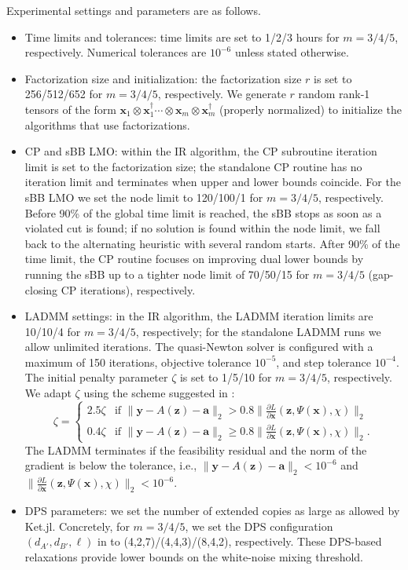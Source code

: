 \documentclass[smallextended]{svjour3}
\newcommand{\1}{\mathbf{1}}
\newcommand{\x}{\mathbf{x}}
\newcommand{\y}{\mathbf{y}}
\newcommand{\z}{\mathbf{z}}
\renewcommand{\a}{\mathbf{a}}
\DeclareMathOperator{\mtens}{\otimes}
\newcommand{\norm}[1]{\lVert#1\rVert}
\begin{document}
Experimental settings and parameters are as follows.

\begin{itemize}
    \item Time limits and tolerances: time limits are set to 1/2/3 hours for $m=3/4/5$, respectively. Numerical tolerances are $10^{-6}$ unless stated otherwise.
    \item Factorization size and initialization: the factorization size $r$ is set to 256/512/652 for $m=3/4/5$, respectively. We generate $r$ random rank-1 tensors of the form $\x_{1}\mtens\x_{1}^\dagger\cdots\mtens\x_{m}\mtens\x_{m}^\dagger$ (properly normalized) to initialize the algorithms that use factorizations.
    \item CP and sBB LMO: within the IR algorithm, the CP subroutine iteration limit is set to the factorization size; the standalone CP routine has no iteration limit and terminates when upper and lower bounds coincide. For the sBB LMO we set the node limit to 120/100/1 for $m=3/4/5$, respectively. Before 90\% of the global time limit is reached, the sBB stops as soon as a violated cut is found; if no solution is found within the node limit, we fall back to the alternating heuristic with several random starts. After 90\% of the time limit, the CP routine focuses on improving dual lower bounds by running the sBB up to a tighter node limit of 70/50/15 for $m=3/4/5$ (gap-closing CP iterations), respectively.
    \item LADMM settings: in the IR algorithm, the LADMM iteration limits are 10/10/4 for $m=3/4/5$, respectively; for the standalone LADMM runs we allow unlimited iterations. The quasi-Newton solver is configured with a maximum of 150 iterations, objective tolerance $10^{-5}$, and step tolerance $10^{-4}$. The initial penalty parameter $\zeta$ is set to 1/5/10 for $m=3/4/5$, respectively. We adapt $\zeta$ using the scheme suggested in \cite{wang2025solving}:
    \begin{equation}
        \zeta = \begin{cases}
            2.5 \zeta  & \text{if } \norm{\y - A(\z) - \a}_2 > 0.8 \norm{\frac{\partial L}{\partial \x}(\z,\Psi(\x),\chi)}_2 \\
            0.4 \zeta  & \text{if } \norm{\y - A(\z) - \a}_2     \geq 0.8 \norm{\frac{\partial L}{\partial \x}(\z,\Psi(\x),\chi)}_2.
        \end{cases}
    \end{equation}
    The LADMM terminates if the feasibility residual and the norm of the gradient is below the tolerance, i.e., $\| \y - A(\z) - \a\|_2 < 10^{-6}$ and $ \norm{\frac{\partial L}{\partial \x}(\z,\Psi(\x),\chi)}_2 < 10^{-6}$.
    \item DPS parameters: we set the number of extended copies as large as allowed by  Ket.jl. Concretely, for $m=3/4/5$, we set the DPS configuration $(d_{A'},d_{B'},\ell)$ in  to (4,2,7)/(4,4,3)/(8,4,2), respectively. These DPS-based relaxations provide lower bounds on the white-noise mixing threshold.
\end{itemize}
\end{document}
